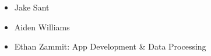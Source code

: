 \begin{itemize}

    \item Jake Sant

    \item Aiden Williams

    \item Ethan Zammit: App Development \& Data Processing

\end{itemize}